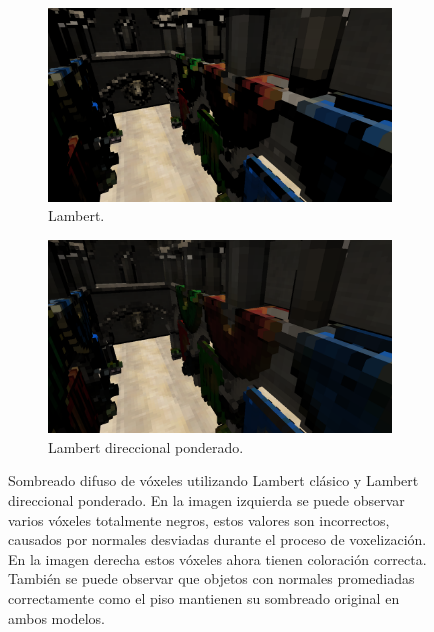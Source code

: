 \begin{figure}[H]
	\centering
	\begin{subfigure}[t]{0.49\textwidth}
		\centering
		\captionsetup{justification=centering}
		\includegraphics[width=\linewidth]{media/classic_lambert.png}
		\caption*{Lambert.}
	\end{subfigure}%
	\hspace{0.01\textwidth}
	\begin{subfigure}[t]{0.49\textwidth}
		\centering
		\captionsetup{justification=centering}
		\includegraphics[width=\linewidth]{media/dir_lambert.png}
		\caption*{Lambert direccional ponderado.}
	\end{subfigure}%
	\caption{Sombreado difuso de vóxeles utilizando Lambert clásico y Lambert direccional ponderado. En la imagen izquierda se puede observar varios vóxeles totalmente negros, estos valores son incorrectos, causados por normales desviadas durante el proceso de voxelización. En la imagen derecha estos vóxeles ahora tienen coloración correcta. También se puede observar que objetos con normales promediadas correctamente como el piso mantienen su sombreado original en ambos modelos.}
	\label{fig:lambert_dir_diff}
\end{figure}

